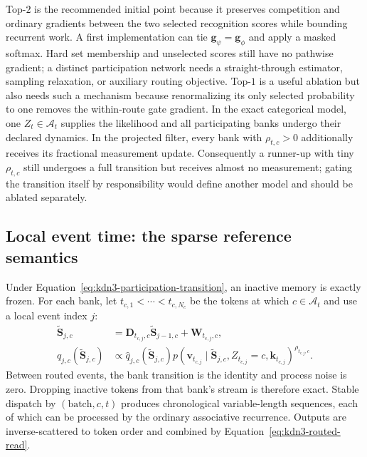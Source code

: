 \documentclass[11pt]{article}
\newcommand{\ve}[1]{\boldsymbol{#1}}
\begin{document}
Top-$2$ is the recommended initial point because it preserves competition and ordinary gradients
between the two selected recognition scores while bounding recurrent work.  A first implementation
can tie $\ve{g}_{\psi}=\ve{g}_{\phi}$ and apply a masked softmax.  Hard set membership and
unselected scores still have no pathwise gradient; a distinct participation network needs a
straight-through estimator, sampling relaxation, or auxiliary routing objective.  Top-$1$ is a
useful ablation but also needs such a mechanism because renormalizing its only selected probability
to one removes the within-route gate gradient.
In the exact categorical model, one $Z_t\in\mathcal{A}_t$ supplies the likelihood and all
participating banks undergo their declared dynamics.  In the projected filter, every bank with
$\rho_{t,c}>0$ additionally receives its fractional measurement update.  Consequently a runner-up
with tiny $\rho_{t,c}$ still undergoes a full transition but receives almost no measurement; gating
the transition itself by responsibility would define another model and should be ablated
separately.

\subsection{Local event time: the sparse reference semantics}

Under Equation~\eqref{eq:kdn3-participation-transition}, an inactive memory is exactly frozen.  For
each bank, let $t_{c,1}<\cdots<t_{c,N_c}$ be the tokens at which
$c\in\mathcal{A}_t$ and use a local event index $j$:
\begin{equation}
\begin{aligned}
  \widetilde{\ve{S}}_{j,c}
  &=\ve{D}_{t_{c,j},c}\widetilde{\ve{S}}_{j-1,c}
    +\ve{W}_{t_{c,j},c},
  \\
  q_{j,c}(\widetilde{\ve{S}}_{j,c})
  &\propto
  \widehat q_{j,c}(\widetilde{\ve{S}}_{j,c})
  p(\ve{v}_{t_{c,j}}\mid
    \widetilde{\ve{S}}_{j,c},Z_{t_{c,j}}=c,
    \ve{k}_{t_{c,j}})^{\rho_{t_{c,j},c}}.
\end{aligned}
  \label{eq:kdn3-local-clock-model}
\end{equation}
Between routed events, the bank transition is the identity and process noise is zero.  Dropping
inactive tokens from that bank's stream is therefore exact.  Stable dispatch by
$(\text{batch},c,t)$ produces chronological variable-length sequences, each of which can be
processed by the ordinary associative recurrence.  Outputs are inverse-scattered to token order
and combined by Equation~\eqref{eq:kdn3-routed-read}.
\end{document}
